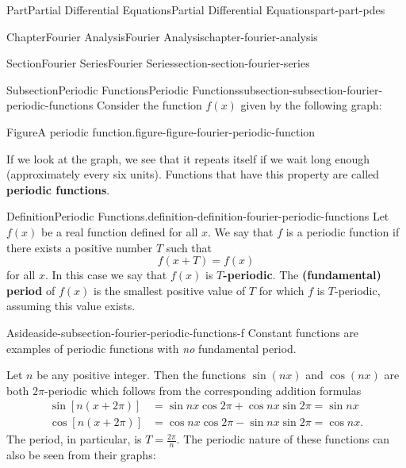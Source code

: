 \documentclass[twoside,10pt,]{book}
\newcommand{\terminology}[1]{\textbf{#1}}
\numberwithin{equation}{part}
\newcommand{\amp}{&}
\begin{document}
\begin{partptx}{Part}{Partial Differential Equations}{}{Partial Differential Equations}{}{}{part-part-pdes}
\begin{chapterptx}{Chapter}{Fourier Analysis}{}{Fourier Analysis}{}{}{chapter-fourier-analysis}
\begin{sectionptx}{Section}{Fourier Series}{}{Fourier Series}{}{}{section-section-fourier-series}
\begin{subsectionptx}{Subsection}{Periodic Functions}{}{Periodic Functions}{}{}{subsection-subsection-fourier-periodic-functions}
Consider the function \(f(x)\) given by the following graph:%
\begin{figureptx}{Figure}{A periodic function.}{figure-figure-fourier-periodic-function}{}%
\begin{image}{0}{1}{0}{}%
%
\end{image}%
\tcblower
\end{figureptx}%
If we look at the graph, we see that it repeats itself if we wait long enough (approximately every six units). Functions that have this property are called \terminology{periodic functions}.%
\begin{definition}{Definition}{Periodic Functions.}{definition-definition-fourier-periodic-functions}%
%
Let \(f(x)\) be a real function defined for all \(x\). We say that \(f\) is a periodic function if there exists a positive number \(T\) such that%
\begin{equation*}
f(x+T) = f(x)
\end{equation*}
for all \(x\). In this case we say that \(f(x)\) is \terminology{\(T\)-periodic}. The \terminology{(fundamental) period} of \(f(x)\) is the smallest positive value of \(T\) for which \(f\) is \(T\)-periodic, assuming this value exists.%
\end{definition}
\begin{aside}{Aside}{}{aside-subsection-fourier-periodic-functions-f}%
Constant functions are examples of periodic functions with \emph{no} fundamental period.%
\end{aside}
 Let \(n\) be any positive integer. Then the functions \(\sin(nx)\) and \(\cos(nx)\) are both \(2\pi\)-periodic which follows from the corresponding addition formulas%
\begin{align*}
\sin[n(x+2\pi)] \amp = \sin nx\cos2\pi + \cos nx\sin2\pi = \sin nx \\
\cos[n(x+2\pi)] \amp = \cos nx\cos2\pi - \sin nx\sin2\pi = \cos nx \text{.}
\end{align*}
The period, in particular, is \(T = \frac{2\pi}{n}\). The periodic nature of these functions can also be seen from their graphs:%

\end{subsectionptx}
\end{sectionptx}
\end{chapterptx}
\end{partptx}
\end{document}
